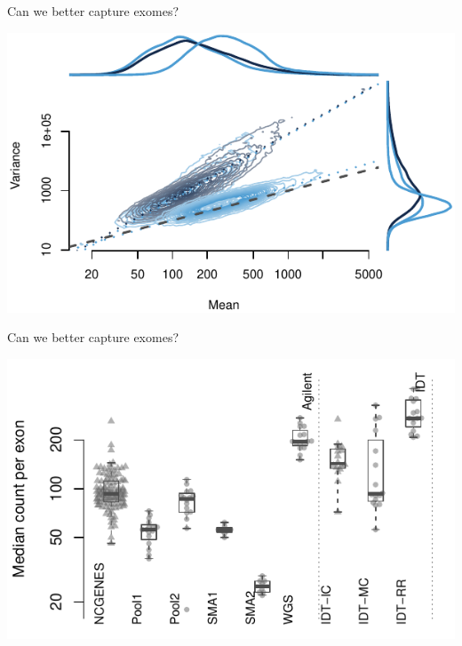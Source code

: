 \documentclass[
  10pt,
  ignorenonframetext,
  m]{beamer}
\begin{document}
\begin{frame}{Can we better capture exomes?}
\protect\hypertarget{can-we-better-capture-exomes-4}{}

\begin{center}\includegraphics{defense_files/figure-beamer/idtMnVr-1} \end{center}

\end{frame}

\begin{frame}{Can we better capture exomes?}
\protect\hypertarget{can-we-better-capture-exomes-5}{}

\begin{center}\includegraphics{defense_files/figure-beamer/medIntMolCount-1} \end{center}

\end{frame}
\end{document}

